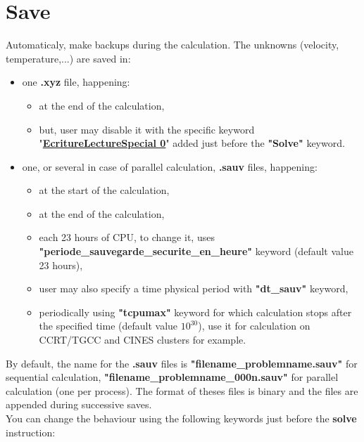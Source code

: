 \section{Save}
Automaticaly, \trust make backups during the calculation. The unknowns (velocity, temperature,...) are saved in:
\begin{itemize}
\item one \textbf{.xyz} file, happening:
    \begin{itemize}
    \item at the end of the calculation,
    \item but, user may disable it with the specific keyword "\href{\REFERENCEMANUAL\#ecriturelecturespecial}{\textbf{EcritureLectureSpecial 0}}" added just before the \textbf{"Solve"} keyword.
    \end{itemize}


\item one, or several in case of parallel calculation, \textbf{.sauv} files, happening:
    \begin{itemize}
    \item at the start of the calculation,
    \item at the end of the calculation,
    \item each 23 hours of CPU, to change it, uses \small \textbf{"periode\_sauvegarde\_securite\_en\_heure"} \normalsize keyword (default value 23 hours),
    \item user may also specify a time physical period with \textbf{"dt\_sauv"} keyword,
    \item periodically using \textbf{"tcpumax"} keyword for which calculation stops after the specified time (default value $10^{30}$), use it for calculation on CCRT/TGCC and CINES clusters for example.
    \end{itemize}
\end{itemize}


By default, the name for the \textbf{.sauv} files is \textbf{"filename\_problemname.sauv"} for sequential calculation, \textbf{"filename\_problemname\_000n.sauv"} for parallel calculation (one per process).
The format of theses files is binary and the files are appended during successive saves.\\

You can change the behaviour using the following keywords just before the \textbf{solve} instruction:
\begin{center}
\end{center}


